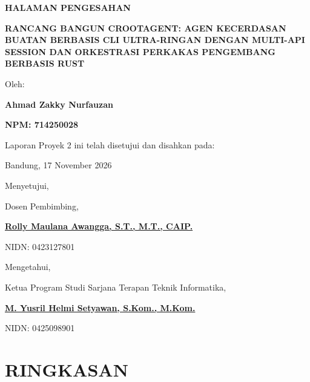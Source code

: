 \documentclass[12pt,a4paper]{article}
\newcommand{\docTitle}{RANCANG BANGUN CROOTAGENT: AGEN KECERDASAN BUATAN BERBASIS CLI ULTRA-RINGAN DENGAN MULTI-API SESSION DAN ORKESTRASI PERKAKAS PENGEMBANG BERBASIS RUST}
\newcommand{\docName}{Ahmad Zakky Nurfauzan}
\newcommand{\docNPM}{714250028}
\newcommand{\docPembimbing}{Rolly Maulana Awangga, S.T., M.T., CAIP.}
\begin{document}
\begin{center}
    {\fontsize{14}{17}\selectfont\textbf{HALAMAN PENGESAHAN}\par}
    \vspace{1.2cm}
    
    {\fontsize{12}{15}\selectfont
    \textbf{\docTitle}\par}
    
    \vspace{1cm}
    
    Oleh:\par
    \textbf{\docName}\par
    \textbf{NPM: \docNPM}\par
    
    \vspace{1cm}
    Laporan Proyek 2 ini telah disetujui dan disahkan pada:\par
    Bandung, 17 November 2026\par
    
    \vspace{1.5cm}
    
    Menyetujui,\par
    Dosen Pembimbing,\par
    
    \vspace{2.5cm}
    
    \textbf{\underline{\docPembimbing}}\par
    NIDN: 0423127801\par
    
    \vspace{1.5cm}
    
    Mengetahui,\par
    Ketua Program Studi Sarjana Terapan Teknik Informatika,\par
    
    \vspace{2.5cm}
    
    \textbf{\underline{M. Yusril Helmi Setyawan, S.Kom., M.Kom.}}\par
    NIDN: 0425098901\par
\end{center}
\newpage

\setcounter{page}{1}

\section*{RINGKASAN}
{}

\clearpage
\end{document}
